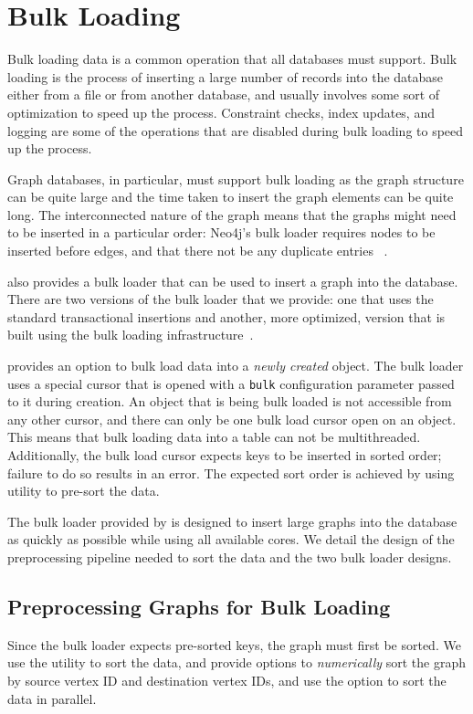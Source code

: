 \section{Bulk Loading}
\label{arch:bulkloading}
Bulk loading data is a common operation that all databases must support.
Bulk loading is the process of inserting a large number of records into the database either from a file or from another database, and usually involves some sort of optimization to speed up the process.
Constraint checks, index updates, and logging are some of the operations that are disabled during bulk loading to speed up the process.

Graph databases, in particular, must support bulk loading as the graph structure can be quite large and the time taken to insert the graph elements can be quite long.
The interconnected nature of the graph means that the graphs might need to be inserted in a particular order: Neo4j's bulk loader requires nodes to be inserted before edges, and that there not be any duplicate entries ~\cite{ImportOp75:online}.

\project{} also provides a bulk loader that can be used to insert a graph into the database.
There are two versions of the bulk loader that we provide: one that uses the standard transactional insertions and another, more optimized, version that is built using the \wt{} bulk loading infrastructure~\cite{WiredTig13:online}.

\wt{} provides an option to bulk load data into a \emph{newly created} object. 
The bulk loader uses a special cursor that is opened with a \texttt{bulk} configuration parameter passed to it during creation.
An object that is being bulk loaded is not accessible from any other cursor, and there can only be one bulk load cursor open on an object.
This means that bulk loading data into a table can not be multithreaded.
Additionally, the bulk load cursor expects keys to be inserted in sorted order; failure to do so results in an error.
The expected sort order is achieved by using  utility to pre-sort the data.

The bulk loader provided by \project{} is designed to insert large graphs into the database as quickly as possible while using all available cores.
We detail the design of the preprocessing pipeline needed to sort the data and the two bulk loader designs.

\subsection{Preprocessing Graphs for Bulk Loading}
Since the bulk loader expects pre-sorted keys, the graph must first be sorted. 
We use the  utility to sort the data, and provide options to \emph{numerically} sort the graph by source vertex ID and destination vertex IDs, and use the  option to sort the data in parallel.

